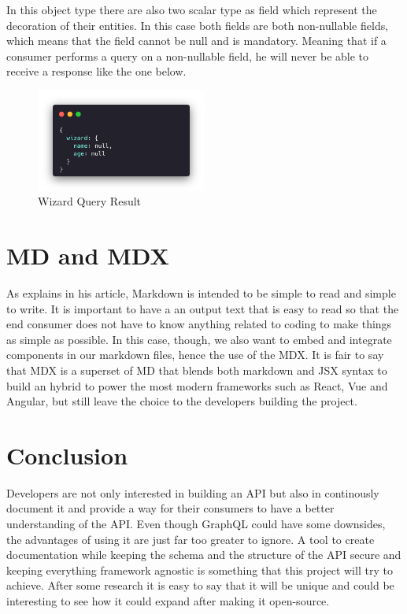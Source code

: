 In this object type there are also two scalar type as field which represent
the decoration of their entities. In this case both fields are both non-nullable
fields, which means that the field cannot be null and is mandatory. Meaning that
if a consumer performs a query on a non-nullable field, he will never be able
to receive a response like the one below.

\begin{figure}[H]
  \centering
  \includegraphics[width=0.5\textwidth]{figures/code/wizardresult}
  \caption{Wizard Query Result}
  \label{f:Wizard-Query-Result}
\end{figure}


\section{MD and MDX}
\label{s:MDandMDX}
As \citet{gruber38MarkdownSyntax2020} explains in his article, Markdown is
intended to be simple to read and simple to write. It is important to have a an
output text that is easy to read so that the end consumer does not have to know
anything related to coding to make things as simple as possible. In this case,
though, we also want to embed and integrate components in our markdown files,
hence the use of the MDX. It is fair to say that MDX is a superset of MD that
blends both markdown and JSX syntax to build an hybrid to power the most modern
frameworks such as React, Vue and Angular, but still leave the choice to the
developers building the project.

\section{Conclusion}
\label{s:Literature-Conclusion}
Developers are not only interested in building an API but also in continously
document it and provide a way for their consumers to have a better understanding
of the API. Even though GraphQL could have some downsides, the advantages of
using it are just far too greater to ignore. A tool to create documentation
while keeping the schema and the structure of the API secure and keeping
everything framework agnostic is something that this project will try to achieve.
After some research it is easy to say that it will be unique and could be
interesting to see how it could expand after making it open-source.
